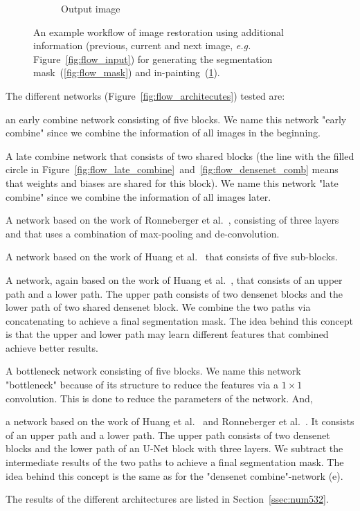 \begin{figure}[H]
\begin{subfigure}{.3\textwidth}
		\caption[figure]{Output image}
		\label{fig:flow_output}
	\end{subfigure}
	\caption[figure]{An example workflow of image restoration using additional information (previous, current and next image, \textit{e.g.} Figure~\ref{fig:flow_input}) for generating the segmentation mask~(\ref{fig:flow_mask}) and in-painting~(\ref{fig:flow_output}).}
	\label{fig:flow_flow}
\end{figure}


The different networks (Figure~\ref{fig:flow_architecutes}) tested are: \begin{enumerate*}[label=(\alph*)]\item an early combine network consisting of five blocks. We name this network "early combine" since we combine the information of all images in the beginning. \item A late combine network that consists of two shared blocks (the line with the filled circle in Figure~\ref{fig:flow_late_combine}~and~\ref{fig:flow_densenet_comb} means that weights and biases are shared for this block). We name this network "late combine" since we combine the information of all images later. \item A network based on the work of Ronneberger et al.~\cite{Ronneberger15}, consisting of three layers and that uses a combination of max-pooling and de-convolution. \item A network based on the work of Huang et al.~\cite{Huang16} that consists of five sub-blocks. \item A network, again based on the work of Huang et al.~\cite{Huang16}, that consists of an upper path and a lower path. The upper path consists of two densenet blocks and the lower path of two shared densenet block. We combine the two paths via concatenating to achieve a final segmentation mask. The idea behind this concept is that the upper and lower path may learn different features that combined achieve better results. \item A bottleneck network consisting of five blocks. We name this network "bottleneck" because of its structure to reduce the features via a $1\times1$ convolution. This is done to reduce the parameters of the network. And, \item a network based on the work of Huang et al.~\cite{Huang16} and Ronneberger et al.~\cite{Ronneberger15}. It consists of an upper path and a lower path. The upper path consists of two densenet blocks and the lower path of an U-Net block with three layers. We subtract the intermediate results of the two paths to achieve a final segmentation mask. The idea behind this concept is the same as for the "densenet combine"-network (e). \end{enumerate*}
The results of the different architectures are listed in Section~\ref{ssec:num532}.

